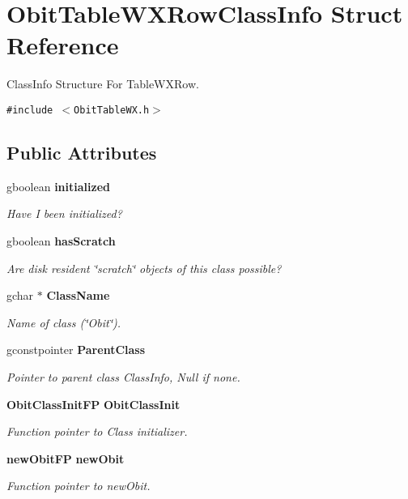 \section{Obit\-Table\-WXRow\-Class\-Info Struct Reference}
\label{structObitTableWXRowClassInfo}
Class\-Info Structure For Table\-WXRow.  


{\tt \#include $<$Obit\-Table\-WX.h$>$}

\subsection*{Public Attributes}
\begin{CompactItemize}
\item 
gboolean {\bf initialized}
\begin{CompactList}\small\item\em Have I been initialized? \item\end{CompactList}\item 
gboolean {\bf has\-Scratch}
\begin{CompactList}\small\item\em Are disk resident \char`\"{}scratch\char`\"{} objects of this class possible? \item\end{CompactList}\item 
gchar $\ast$ {\bf Class\-Name}
\begin{CompactList}\small\item\em Name of class (\char`\"{}Obit\char`\"{}). \item\end{CompactList}\item 
gconstpointer {\bf Parent\-Class}
\begin{CompactList}\small\item\em Pointer to parent class Class\-Info, Null if none. \item\end{CompactList}\item 
{\bf Obit\-Class\-Init\-FP} {\bf Obit\-Class\-Init}
\begin{CompactList}\small\item\em Function pointer to Class initializer. \item\end{CompactList}\item 
{\bf new\-Obit\-FP} {\bf new\-Obit}
\begin{CompactList}\small\item\em Function pointer to new\-Obit. \item\end{CompactList}\item 

\end{CompactItemize}
